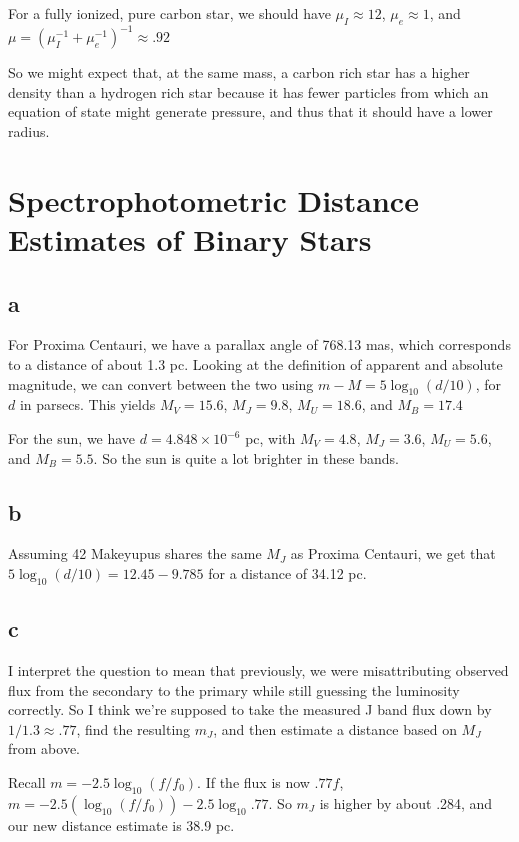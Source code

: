 \documentclass[12pt]{article}
\begin{document}
For a fully ionized, pure carbon star, we should have \(\mu_I \approx 12\), \(\mu_e \approx 1\), and \(\mu = (\mu_I^{-1} + \mu_e^{-1})^{-1} \approx .92\)

So we might expect that, at the same mass, a carbon rich star has a higher density than a hydrogen rich star because it has fewer particles from which an equation of state might generate pressure, and thus that it should have a lower radius.


\section{Spectrophotometric Distance Estimates of Binary Stars}

\subsection*{a}

For Proxima Centauri, we have a parallax angle of 768.13 mas, which corresponds to a distance of about 1.3 pc. Looking at the definition of apparent and absolute magnitude, we can convert between the two using \(m-M = 5\log_{10}{(d/10)}\), for \(d\) in parsecs. This yields \(M_V = 15.6\), \(M_J = 9.8\), \(M_U = 18.6\), and \(M_B = 17.4\)

For the sun, we have \(d = 4.848 \times 10^{-6}\) pc, with  \(M_V = 4.8\), \(M_J = 3.6\), \(M_U = 5.6\), and \(M_B = 5.5\). So the sun is quite a lot brighter in these bands.

\subsection*{b}

Assuming 42 Makeyupus shares the same \(M_J\) as Proxima Centauri, we get that \( 5\log_{10}(d/10) = 12.45-9.785\) for a distance of 34.12 pc.

\subsection*{c}

I interpret the question to mean that previously, we were misattributing observed flux from the secondary to the primary while still guessing the luminosity correctly. So I think we're supposed to take the measured J band flux down by \(1/1.3 \approx .77\), find the resulting \(m_J\), and then estimate a distance based on \(M_J\) from above.

Recall \(m = -2.5\log_{10}(f/f_0)\). If the flux is now \(.77f\),  \(m=-2.5(\log_{10}(f/f_0)) -2.5 \log_{10}.77 \). So \(m_J\) is higher by about .284, and our new distance estimate is 38.9 pc.
\end{document}
